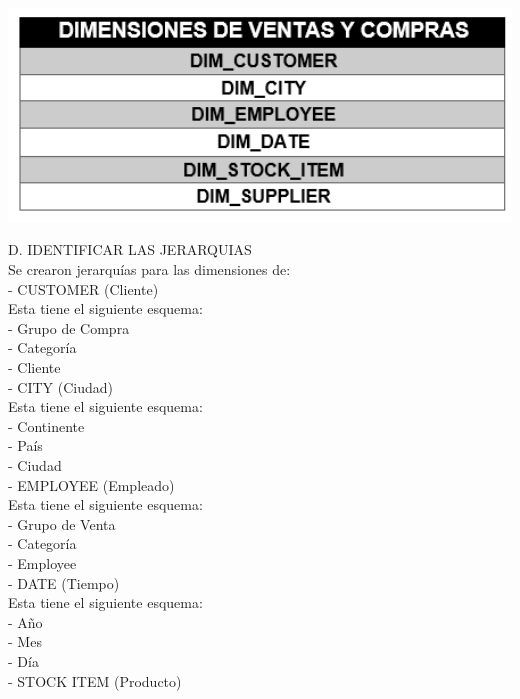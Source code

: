\documentclass[12pt,letterpaper]{article}
\begin{document}
\begin{center}
\includegraphics[width=17cm]{IMG/10.png} 
\end{center}

D.	IDENTIFICAR LAS JERARQUIAS\\

Se crearon jerarqu\'ias para las dimensiones de:\\

- CUSTOMER (Cliente)\\

Esta tiene el siguiente esquema:\\
- Grupo de Compra\\
- Categor\'ia\\
- Cliente\\

- CITY (Ciudad)\\

Esta tiene el siguiente esquema:\\
- Continente\\
- Pa\'is\\
- Ciudad\\

- EMPLOYEE (Empleado)\\

Esta tiene el siguiente esquema:\\
- Grupo de Venta\\
- Categor\'ia\\
- Employee\\



- DATE (Tiempo)\\

Esta tiene el siguiente esquema:\\
- A\~no\\
- Mes\\
- D\'ia\\

- STOCK ITEM (Producto)\\
\end{document}
